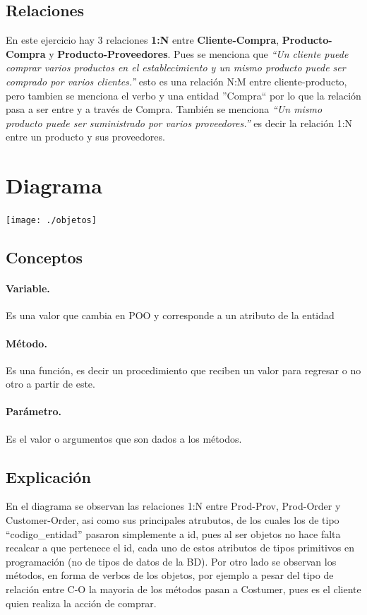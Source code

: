 \documentclass[spanish,12pt,letterpapper]{article}
\begin{document}
	\subsection{Relaciones}
	
	En este ejercicio hay 3 relaciones \textbf{1:N} entre \textbf{Cliente-Compra}, \textbf{Producto-Compra} y \textbf{Producto-Proveedores}. Pues se menciona que \textit{``Un cliente puede comprar varios productos en el establecimiento y un mismo producto puede ser comprado por varios clientes.''} esto es una relación N:M entre cliente-producto, pero tambien se menciona el verbo y una entidad ''Compra`` por lo que la relación pasa a ser entre y a través de Compra. También se menciona \textit{``Un mismo producto puede ser suministrado por varios proveedores.''} es decir la relación 1:N entre un producto y sus proveedores.
	
	
	\section{Diagrama\\}
	
	\begin{center}
		\texttt{[image: ./objetos]}~\\[1cm] 
	\end{center}
	
	\subsection{Conceptos}
	
	\paragraph{Variable.} Es una valor que cambia en POO y corresponde a un atributo de la entidad
	\paragraph{Método.} Es una función, es decir un procedimiento que reciben un valor para regresar o no otro a partir de este.
	\paragraph{Parámetro.} Es el valor o argumentos que son dados a los métodos.
	
    
    \subsection{Explicación}
    En el diagrama se observan las relaciones 1:N entre Prod-Prov, Prod-Order y Customer-Order, asi como sus principales atrubutos, de los cuales los de tipo ``codigo\_entidad'' pasaron simplemente a id, pues al ser objetos no hace falta recalcar a que pertenece el id, cada uno de estos atributos de tipos primitivos en programación (no de tipos de datos de la BD). Por otro lado se observan los métodos, en forma de verbos de los objetos, por ejemplo a pesar del tipo de relación entre C-O la mayoria de los métodos pasan a Costumer, pues es el cliente quien realiza la acción de comprar. 
    
\end{document}
